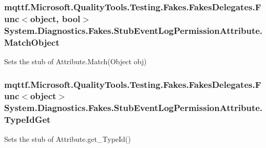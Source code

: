 \hypertarget{class_system_1_1_diagnostics_1_1_fakes_1_1_stub_event_log_permission_attribute_a3932c98b00c2f87df63a1c792e98d19c}{
\subsubsection[{Match\-Object}]{\setlength{\rightskip}{0pt plus 5cm}mqttf.\-Microsoft.\-Quality\-Tools.\-Testing.\-Fakes.\-Fakes\-Delegates.\-Func$<$object, bool$>$ System.\-Diagnostics.\-Fakes.\-Stub\-Event\-Log\-Permission\-Attribute.\-Match\-Object}}\label{class_system_1_1_diagnostics_1_1_fakes_1_1_stub_event_log_permission_attribute_a3932c98b00c2f87df63a1c792e98d19c}


Sets the stub of Attribute.\-Match(\-Object obj)

\hypertarget{class_system_1_1_diagnostics_1_1_fakes_1_1_stub_event_log_permission_attribute_a6b10de8d1a1ea1be9e0b9e7e93072f37}{
\subsubsection[{Type\-Id\-Get}]{\setlength{\rightskip}{0pt plus 5cm}mqttf.\-Microsoft.\-Quality\-Tools.\-Testing.\-Fakes.\-Fakes\-Delegates.\-Func$<$object$>$ System.\-Diagnostics.\-Fakes.\-Stub\-Event\-Log\-Permission\-Attribute.\-Type\-Id\-Get}}\label{class_system_1_1_diagnostics_1_1_fakes_1_1_stub_event_log_permission_attribute_a6b10de8d1a1ea1be9e0b9e7e93072f37}


Sets the stub of Attribute.\-get\-\_\-\-Type\-Id()



